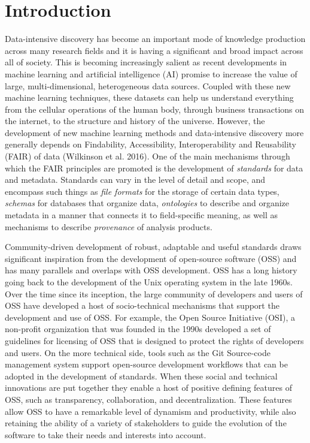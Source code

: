 \documentclass[
  letterpaper,
  DIV=11,
  numbers=noendperiod]{scrartcl}
\begin{document}
\section{Introduction}\label{introduction}

Data-intensive discovery has become an important mode of knowledge
production across many research fields and it is having a significant
and broad impact across all of society. This is becoming increasingly
salient as recent developments in machine learning and artificial
intelligence (AI) promise to increase the value of large,
multi-dimensional, heterogeneous data sources. Coupled with these new
machine learning techniques, these datasets can help us understand
everything from the cellular operations of the human body, through
business transactions on the internet, to the structure and history of
the universe. However, the development of new machine learning methods
and data-intensive discovery more generally depends on Findability,
Accessibility, Interoperability and Reusability (FAIR) of data
(Wilkinson et al. 2016). One of the main mechanisms through which the
FAIR principles are promoted is the development of \emph{standards} for
data and metadata. Standards can vary in the level of detail and scope,
and encompass such things as \emph{file formats} for the storage of
certain data types, \emph{schemas} for databases that organize data,
\emph{ontologies} to describe and organize metadata in a manner that
connects it to field-specific meaning, as well as mechanisms to describe
\emph{provenance} of analysis products.

Community-driven development of robust, adaptable and useful standards
draws significant inspiration from the development of open-source
software (OSS) and has many parallels and overlaps with OSS development.
OSS has a long history going back to the development of the Unix
operating system in the late 1960s. Over the time since its inception,
the large community of developers and users of OSS have developed a host
of socio-technical mechanisms that support the development and use of
OSS. For example, the Open Source Initiative (OSI), a non-profit
organization that was founded in the 1990s developed a set of guidelines
for licensing of OSS that is designed to protect the rights of
developers and users. On the more technical side, tools such as the Git
Source-code management system support open-source development workflows
that can be adopted in the development of standards. When these social
and technical innovations are put together they enable a host of
positive defining features of OSS, such as transparency, collaboration,
and decentralization. These features allow OSS to have a remarkable
level of dynamism and productivity, while also retaining the ability of
a variety of stakeholders to guide the evolution of the software to take
their needs and interests into account.
\end{document}
